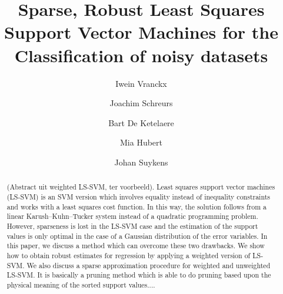 \documentclass[preprint,12pt]{elsarticle}
\begin{document}
	
	\begin{frontmatter}
		
		
		\title{Sparse, Robust Least Squares Support Vector Machines for the Classification of noisy datasets}
		
		
		
		
		
		\author[statistics]{Iwein Vranckx}
		
		\author[stadius]{Joachim Schreurs}
		\author[mebios]{Bart De Ketelaere}
		\author[statistics]{Mia Hubert}
		\author[stadius]{Johan Suykens}
		\address[statistics]{KU Leuven, Department of Mathematics and LStat, Celestijnenlaan 200B, BE-3001 Heverlee, Belgium}
		\address[stadius]{KU Leuven, ESAT-STADIUS, Kasteelpark Arenberg 10, BE-3001 Heverlee, Belgium}
		\address[mebios]{KU Leuven, Division of Mechatronics, Biostatistics and Sensors, Kasteelpark Arenberg 30, BE-3001 Heverlee, Belgium}
		
		\begin{abstract}
			(Abstract uit weighted LS-SVM, ter voorbeeld). Least squares support vector machines (LS-SVM) is an SVM version which involves
			equality instead of inequality constraints and works with a least squares cost function.
			In this way, the solution follows from a linear Karush–Kuhn–Tucker system instead of
			a quadratic programming problem. However, sparseness is lost in the LS-SVM case and
			the estimation of the support values is only optimal in the case of a Gaussian distribution
			of the error variables. In this paper, we discuss a method which can overcome these two
			drawbacks. We show how to obtain robust estimates for regression by applying a weighted
			version of LS-SVM. We also discuss a sparse approximation procedure for weighted and
			unweighted LS-SVM. It is basically a pruning method which is able to do pruning based
			upon the physical meaning of the sorted support values....
			

\end{abstract}
\end{frontmatter}
\end{document}
